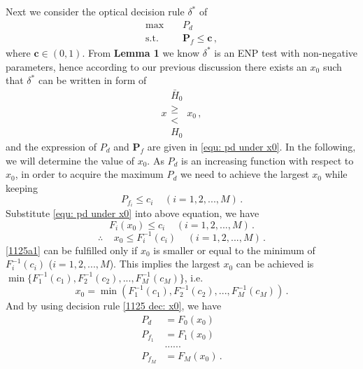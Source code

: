   Next we consider the optical decision rule $\delta^\ast$ of
  \begin{equation}
	\begin{split}
	  \max\;\;\;\; &P_d\\
	  \text{s.t.}\;\;\;\;&\mathbf{P}_f \leq \mathbf{c}\,,
	\end{split}
  \end{equation}
  where $\mathbf{c} \in (0, 1)$.
  From \textbf{Lemma 1} we know $\delta^\ast$ is an ENP test with non-negative parameters, hence according to our previous discussion there exists an $x_0$ such that $\delta^\ast$ can be written in form of 
  \begin{equation}
	\label{1124a1}
	x\substack{\bar{H}_0 \\\geq\\< \\H_0}x_0\,,
  \end{equation}
  and the expression of $P_d$ and $\mathbf{P}_f$ are given in \eqref{equ: pd under x0}. 
  In the following, we will determine the value of $x_0$. 
  As $P_d$ is an increasing function with respect to $x_0$, in order to acquire the maximum $P_d$ we need to achieve the largest $x_0$ while keeping 
  \begin{equation}
	P_{f_i} \leq c_i\;\;\;\;(i = 1, 2, ..., M)\,.
  \end{equation}
  Substitute \eqref{equ: pd under x0} into above equation, we have
  \begin{equation}
	F_i(x_0) \leq c_i \;\;\;\;(i=1, 2, ..., M)\,.
  \end{equation}
  \begin{equation}
	\label{1125a1}
	\therefore\;\;\;\; x_0 \leq F^{-1}_{i}(c_i) \;\;\;\;(i=1, 2, ..., M)\,.
  \end{equation}
  \eqref{1125a1} can be fulfilled only if $x_0$ is 
  smaller or equal to the minimum of $F^{-1}_{i}(c_i)$ ($i=1, 2, ..., M$). This implies the largest $x_0$ can be achieved is $\min\{F_1^{-1}(c_1), F_2^{-1}(c_2), ..., F_M^{-1}(c_M)\}$, i.e.
  \begin{equation}
	\label{1127a2}
	x_0 = \min(F_1^{-1}(c_1), F_2^{-1}(c_2), ..., F_M^{-1}(c_M))\,.
  \end{equation}
  And by  using decision rule \eqref{1125 dec: x0}, we have
  \begin{equation}
	\begin{split}
	  \label{equ: pd under x00}
	  P_d &=  F_0(x_0)\\
	  P_{f_1} &=  F_1(x_0)\\
	  &......\\
	  P_{f_M} &= F_M(x_0)\,.
	\end{split}
  \end{equation}
  \typeout{}
  

  \typeout{}
  
